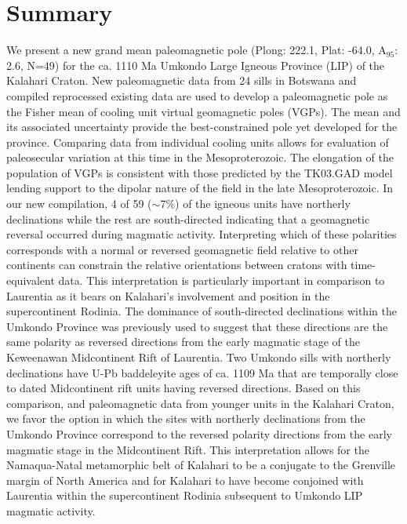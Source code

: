 \documentclass[11pt,letterpaper]{article}
\begin{document}
\section*{Summary}
We present a new grand mean paleomagnetic pole (Plong: 222.1\textdegree, Plat: -64.0\textdegree, A$_{95}$: 2.6, N=49) for the ca. 1110 Ma Umkondo Large Igneous Province (LIP) of the Kalahari Craton. New paleomagnetic data from 24 sills in Botswana and compiled reprocessed existing data are used to develop a paleomagnetic pole as the Fisher mean of cooling unit virtual geomagnetic poles (VGPs). The mean and its associated uncertainty provide the best-constrained pole yet developed for the province. Comparing data from individual cooling units allows for evaluation of paleosecular variation at this time in the Mesoproterozoic. The elongation of the population of VGPs is consistent with those predicted by the TK03.GAD model lending support to the dipolar nature of the field in the late Mesoproterozoic. In our new compilation, 4 of 59 ($\sim$7$\%$) of the igneous units have northerly declinations while the rest are south-directed indicating that a geomagnetic reversal occurred during magmatic activity. Interpreting which of these polarities corresponds with a normal or reversed geomagnetic field relative to other continents can constrain the relative orientations between cratons with time-equivalent data. This interpretation is particularly important in comparison to Laurentia as it bears on Kalahari's involvement and position in the supercontinent Rodinia. The dominance of south-directed declinations within the Umkondo Province was previously used to suggest that these directions are the same polarity as reversed directions from the early magmatic stage of the Keweenawan Midcontinent Rift of Laurentia. Two Umkondo sills with northerly declinations have U-Pb baddeleyite ages of ca. 1109 Ma that are temporally close to dated Midcontinent rift units having reversed directions. Based on this comparison, and paleomagnetic data from younger units in the Kalahari Craton, we favor the option in which the sites with northerly declinations from the Umkondo Province correspond to the reversed polarity directions from the early magmatic stage in the Midcontinent Rift. This interpretation allows for the Namaqua-Natal metamorphic belt of Kalahari to be a conjugate to the Grenville margin of North America and for Kalahari to have become conjoined with Laurentia within the supercontinent Rodinia subsequent to Umkondo LIP magmatic activity.
\end{document}
